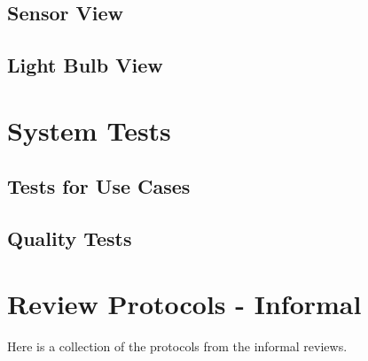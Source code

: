 \documentclass[a4paper]{article}
\begin{document}
\subsection{Sensor View}




\subsection{Light Bulb View}



\newpage
\section{System Tests}

\subsection{Tests for Use Cases}



\subsection{Quality Tests}



\newpage
\section{Review Protocols - Informal}
Here is a collection of the protocols from the informal reviews.










\end{document}
